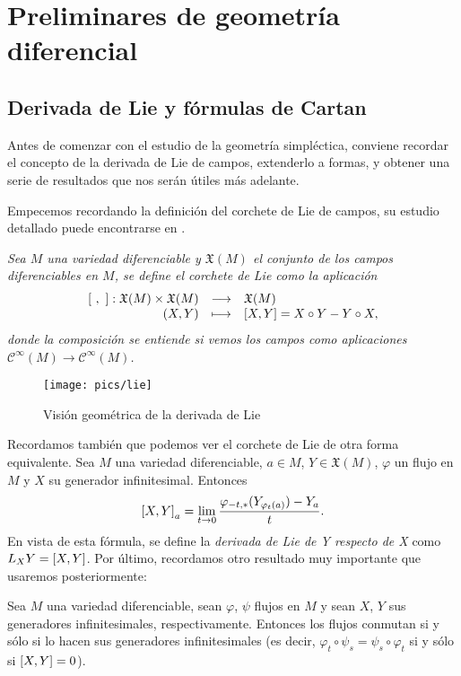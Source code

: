 \chapter{Preliminares de geometría diferencial}
\section{Derivada de Lie y fórmulas de Cartan}\label{sec:lie}

Antes de comenzar con el estudio de la geometría simpléctica, conviene recordar el concepto de la derivada de Lie de campos, extenderlo a formas, y obtener una serie de resultados que nos serán útiles más adelante.

Empecemos recordando la definición del corchete de Lie de campos, su estudio detallado puede encontrarse en \cite{variedades}.

\begin{defn}
  \em
  Sea $M$ una variedad diferenciable y $\mathfrak{X}(M)$ el conjunto de los campos diferenciables en $M$, se define el \emph{corchete de Lie} como la aplicación
  \begin{equation*}
    \begin{array}{rcl}
    \left[\ ,\ \right]: \mathfrak{X}(M) \times \mathfrak{X}(M) & \longrightarrow & \mathfrak{X}(M) \\
    (X,Y) & \longmapsto & \left[X,Y\right] = X \circ Y - Y \circ X,
  \end{array}
  \end{equation*}
  donde la composición se entiende si vemos los campos como aplicaciones $\mathscr{C}^{\infty}(M) \rightarrow \mathscr{C}^{\infty}(M)$.
\end{defn}
\begin{figure}[h]
  \centering
  \texttt{[image: pics/lie]}
  \caption{\small Visión geométrica de la derivada de Lie}
  \label{fig:lie}
\end{figure}
Recordamos también que podemos ver el corchete de Lie de otra forma equivalente. Sea $M$ una variedad diferenciable, $a \in M$, $Y \in \mathfrak{X}(M)$, $\varphi$ un flujo en $M$ y $X$ su generador infinitesimal. Entonces
\begin{equation*}
  \left[X,Y\right]_a= \lim_{t\rightarrow 0}\frac{\varphi_{-t,*}(Y_{\varphi_t(a)})-Y_a}{t}.
\end{equation*}
En vista de esta fórmula, se define la \emph{derivada de Lie de Y respecto de X} como $L_XY=\left[X,Y\right]$. 
Por último, recordamos otro resultado muy importante que usaremos posteriormente:
\begin{prop}
  Sea $M$ una variedad diferenciable, sean $\varphi$, $\psi$ flujos en $M$ y sean $X$, $Y$ sus generadores infinitesimales, respectivamente. Entonces los flujos conmutan si y sólo si lo hacen sus generadores infinitesimales (es decir, $\varphi_t \circ \psi_s = \psi_s \circ \varphi_t$ si y sólo si $\left[X,Y\right]=0$).
\end{prop} 

